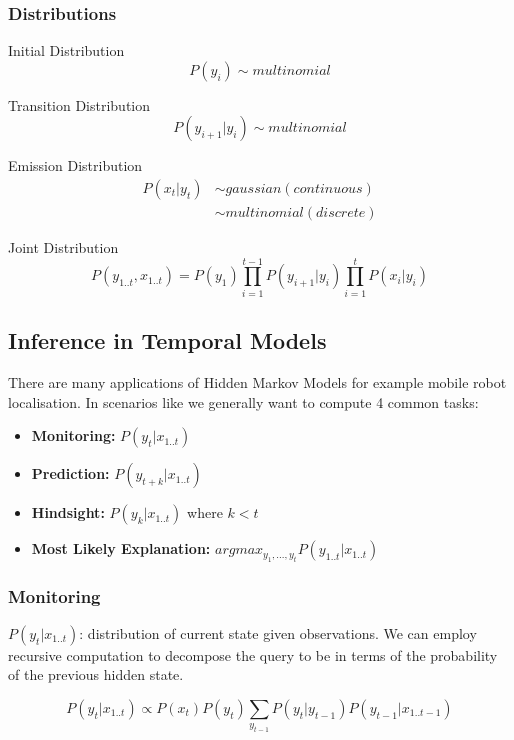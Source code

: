 \documentclass[12pt]{article}
\begin{document}
        \subsubsection{Distributions}
            Initial Distribution
            $$ P(y_i) \sim multinomial $$

            Transition Distribution
            $$ P(y_{i+1}|y_{i}) \sim multinomial $$

            Emission Distribution
            \begin{align*}
                P(x_{t} | y_{t}) & \sim gaussian (continuous) \\
                & \sim multinomial (discrete)
            \end{align*}

            Joint Distribution
            $$ P(y_{1 .. t}, x_{1 .. t}) = P(y_{1})\prod_{i=1}^{t-1} P(y_{i+1}|y_{i}) \prod_{i=1}^{t} P(x_{i}|y_{i})
            $$
            
    \subsection{Inference in Temporal Models}
        There are many applications of Hidden Markov Models for example mobile robot localisation. 
        In scenarios like we generally want to compute 4 common tasks:
        \begin{itemize}
            \item \textbf{Monitoring: } $P(y_t|x_{1..t})$
            \item \textbf{Prediction: } $P(y_{t+k} | x_{1..t}) $
            \item \textbf{Hindsight: } $P(y_k | x_{1..t})$ where $k < t$
            \item \textbf{Most Likely Explanation: } $argmax_{y_1,...,y_t} P(y_{1..t}|x_{1..t})$
        \end{itemize}
        
        \subsubsection{Monitoring}
            $P(y_{t}|x_{1..t})$: distribution of current state given observations. We can employ recursive computation to 
            decompose the query to be in terms of the probability of the previous hidden state.

            $$ P(y_{t}|x_{1..t}) \propto P(x_t)P(y_t) \sum_{y_{t-1}}P(y_{t}|y_{t-1})P(y_{t-1}|x_{1..t-1}) $$
\end{document}
